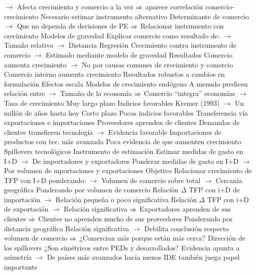 \documentclass{nuevotema}
\begin{document}
\begin{esquemal}
				\4[] $\to$ Afecta crecimiento y comercio a la vez
				\4[] $\Rightarrow$ aparece correlación comercio-crecimiento
				\4 Necesario estimar instrumento alternativo
				\4[] Determinante de comercio
				\4[] $\to$ Que no dependa de decisiones de PE
				\4[] $\Rightarrow$ Relacionar instrumento con crecimiento
				\4 Modelos de gravedad
				\4[] Explicar comercio como resultado de:
				\4[] $\to$ Tamaño relativo
				\4[] $\to$ Distancia
				\4 Regresión
				\4[] Crecimiento contra instrumento de comercio
				\4[] $\to$ Estimado mediante modelo de gravedad
				\4 Resultados
				\4[] Comercio aumenta crecimiento
				\4[] $\to$ No por causas comunes de crecimiento y comercio
				\4[] Comercio interno aumenta crecimiento
				\4[] Resultados robustos a cambios en formulación
			\3 Efectos escala
				\4 Modelos de crecimiento endógeno
				\4[] A menudo predicen relación entre
				\4[] $\to$ Tamaño de la economía
				\4[] $\Rightarrow$ Comercio ``integra'' economías
				\4[] $\to$ Tasa de crecimiento
				\4 Muy largo plazo
				\4[] Indicios favorables
				\4[] Kremer (1993)
				\4[] $\to$ Un millón de años hasta hoy
				\4 Corto plazo
				\4[] Pocos indicios favorables
			\3 Transferencia vía exportaciones e importaciones
				\4 Proveedores aprenden de clientes
				\4[] Demandas de clientes transfieren tecnología
				\4[] $\to$ Evidencia favorable
				\4 Importaciones de productos con tec. más avanzada
				\4[] Poca evidencia de que aumenten crecimiento
			\3 Spillovers tecnológicos
				\4 Instrumento de estimación
				\4[] Estimar medidas de gasto en I+D
				\4[] $\to$ De importadores y exportadores
				\4[] Ponderar medidas de gasto en I+D
				\4[] $\to$ Por volumen de mportaciones y exportaciones
				\4 Objetivo
				\4[] Relacionar crecimiento de TFP con I+D ponderando:
				\4[] $\to$ Volumen de comercio sobre total
				\4[] $\to$ Cercanía geográfica
				\4 Ponderando por volumen de comercio
				\4[] Relación $\Delta$ TFP con i+D de importación
				\4[] $\to$ Relación pequeña o poco significativa
				\4[] Relación $\Delta$ TFP con i+D de exportación
				\4[] $\to$ Relación significativa
				\4[] $\Rightarrow$ Exportadores aprenden de sus clientes
				\4[] $\Rightarrow$ Clientes no aprenden mucho de sus proveedores
				\4 Ponderando por distancia geográfica
				\4[] Relación significativa
				\4[] $\to$ Debilita conclusión respecto volumen de comercio
				\4[] $\Rightarrow$ ¿Comercian más porque están más cerca?
				\4 Dirección de los spillovers
				\4[] ¿Son simétricos entre PEDs y desarrollados?
				\4[] Evidencia apunta a asimetría
				\4[] $\to$ De países más avanzados hacia menos
				\4[] IDE también juega papel importante

\end{esquemal}
\end{document}
